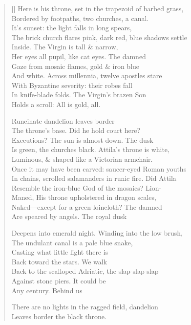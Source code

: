 \label{ch:venezia_torcello}
\settowidth{\versewidth}{In chains, scrolled salamanders in runic fire.   Did Attila}
\begin{verse}[\versewidth]
Here is his throne, set in the trapezoid of barbed grass,\\
Bordered by footpaths, two churches, a canal.\\
It's sunset: the light falls in long spears,\\
The brick church flares pink, dark red, blue shadows settle\\
Inside.    The Virgin is tall \& narrow,\\
Her eyes all pupil, like cat eyes.     The damned\\
Gaze from mosaic flames, gold \& iron blue\\
And white.   Across millennia, twelve apostles stare\\
With Byzantine severity: their robes fall\\
In knife-blade folds. The Virgin's brazen Son\\
Holds a scroll: All is gold, all.

Runcinate dandelion leaves border\\
The throne's base.   Did he hold court here?\\
Executions?   The sun is almost down.   The dusk\\
Is green, the churches black.   Attila's throne is white,\\
Luminous, \& shaped like a Victorian armchair.\\
Once it may have been carved: saucer-eyed Roman youths\\
In chains, scrolled salamanders in runic fire.   Did Attila\\
Resemble the iron-blue God of the mosaics? Lion-\\
Maned, His throne upholstered in dragon scales,\\
Naked---except for a green loincloth?   The damned\\
Are speared by angels.   The royal dusk

Deepens into emerald night.  Winding into the low brush,\\
The undulant canal is a pale blue snake,\\
Casting what little light there is\\
Back toward the stars.     We walk\\
Back to the scalloped Adriatic, the slap-slap-slap\\
Against stone piers.    It could be\\
Any century. Behind us

There are no lights in the ragged field, dandelion\\
Leaves border the black throne.
\end{verse}
